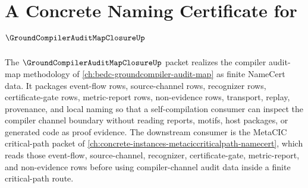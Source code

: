 \chapter{A Concrete Naming Certificate for $\GroundCompilerAuditMapClosureUp$}
\label{ch:concrete-instances-groundcompiler-audit-map-closure-namecert}

The $\GroundCompilerAuditMapClosureUp$ packet realizes the compiler audit-map methodology of \autoref{ch:bedc-groundcompiler-audit-map} as finite NameCert data. It packages event-flow rows, source-channel rows, recognizer rows, certificate-gate rows, metric-report rows, non-evidence rows, transport, replay, provenance, and local naming so that a self-compilation consumer can inspect the compiler channel boundary without reading reports, motifs, host packages, or generated code as proof evidence. The downstream consumer is the MetaCIC critical-path packet of \autoref{ch:concrete-instances-metaciccriticalpath-namecert}, which reads those event-flow, source-channel, recognizer, certificate-gate, metric-report, and non-evidence rows before using compiler-channel audit data inside a finite critical-path route.


